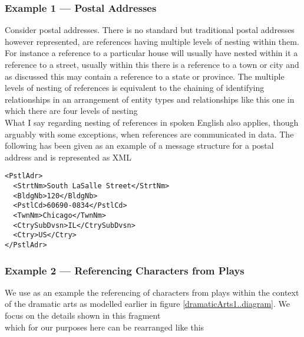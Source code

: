 \subsubsection{Example 1 --- Postal Addresses}
\mynote
Consider postal addresses. There is no standard but traditional postal addresses however
represented, are references having multiple levels of nesting within them.
For instance a reference to a particular house will usually have nested within it a reference to a street, usually within this there is a reference to a town or city and
as discussed this may contain a reference to a state or province.  
The multiple levels of nesting of references is equivalent to
the chaining of identifying relationships in an arrangement
of entity types and relationships like this one in which there are four levels of nesting
\begin{equation*}

\end{equation*}
\mynote
What I say regarding nesting of references in spoken English also applies, though arguably with some exceptions, when references are communicated in data.
The following has been given as an example of a message structure for a postal address and is represented as XML
\begin{verbatim}
<PstlAdr>
  <StrtNm>South LaSalle Street</StrtNm>
  <BldgNb>120</BldgNb>
  <PstlCd>60690-0834</PstlCd>
  <TwnNm>Chicago</TwnNm>
  <CtrySubDvsn>IL</CtrySubDvsn>
  <Ctry>US</Ctry>
</PstlAdr>
\end{verbatim}

\subsubsection{Example 2 --- Referencing Characters from Plays}
\mynote
 We use as an example the referencing of characters from  plays
 within the context of  the  dramatic arts
   as modelled earlier in figure \ref{dramaticArts1..diagram}.
We focus on the details shown in this fragment 
\begin{equation*}

\end{equation*}
which for our purposes here can be rearranged like this

\begin{equation*}

\end{equation*}


